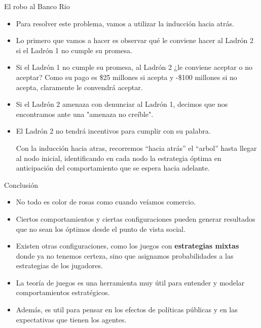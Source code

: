 \documentclass{beamer}
\begin{document}
\begin{frame}{El robo al Banco Rio}
    \begin{itemize}
        \item Para resolver este problema, vamos a utilizar la inducción hacia atrás.
        \item Lo primero que vamos a hacer es observar qué le conviene hacer al Ladrón 2 si el Ladrón 1 no cumple su promesa.
        \item Si el Ladrón 1 no cumple su promesa, al Ladrón 2 ¿le conviene aceptar o no aceptar? Como su pago es \$25 millones si acepta y -\$100 millones si no acepta, claramente
        le convendrá aceptar.
        \item Si el Ladrón 2 amenaza con denunciar al Ladrón 1, decimos que nos encontramos ante una "amenaza no creíble".
        \item El Ladrón 2 no tendrá incentivos para cumplir con su palabra.
        \begin{boxA}
            \centering
            Con la inducción hacia atras, recorremos ``hacia atrás'' el ``arbol'' hasta llegar
            al nodo inicial, identificando en cada nodo la estrategia óptima en
            anticipación del comportamiento que se espera hacia adelante.            
        \end{boxA}
    \end{itemize}
\end{frame}

\begin{frame}{Conclusión}
    \begin{itemize}
        \item No todo es color de rosas como cuando veíamos comercio.
        \item Ciertos comportamientos y ciertas configuraciones pueden generar resultados que no sean los óptimos desde el punto de vista social.
        \item Existen otras configuraciones, como los juegos con \textbf{estrategias mixtas} donde ya no tenemos certeza, sino que asignamos probabilidades a las estrategias de los jugadores.
        \item La teoría de juegos es una herramienta muy útil para entender y modelar comportamientos estratégicos.
        \item Además, es util para pensar en los efectos de políticas públicas y en las expectativas que tienen los agentes.
    \end{itemize}
\end{frame}
\end{document}
